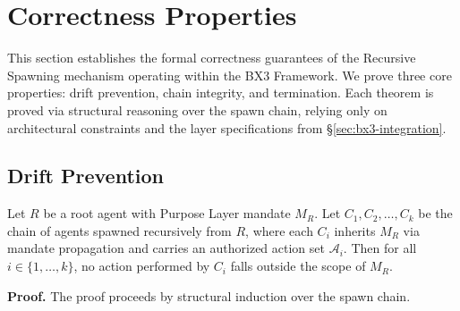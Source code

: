 \section{Correctness Properties}
\label{sec:correctness-properties}

This section establishes the formal correctness guarantees of the Recursive Spawning mechanism operating within the BX3 Framework. We prove three core properties: drift prevention, chain integrity, and termination. Each theorem is proved via structural reasoning over the spawn chain, relying only on architectural constraints and the layer specifications from \S\ref{sec:bx3-integration}.

\subsection{Drift Prevention}
\label{sec:drift-prevention}

\begin{theorem}
Let $R$ be a root agent with Purpose Layer mandate $M_R$. Let $C_1, C_2, \ldots, C_k$ be the chain of agents spawned recursively from $R$, where each $C_i$ inherits $M_R$ via mandate propagation and carries an authorized action set $\mathcal{A}_i$. Then for all $i \in \{1, \ldots, k\}$, no action performed by $C_i$ falls outside the scope of $M_R$.
\end{theorem}

\medskip\noindent
\textbf{Proof.} The proof proceeds by structural induction over the spawn chain.

